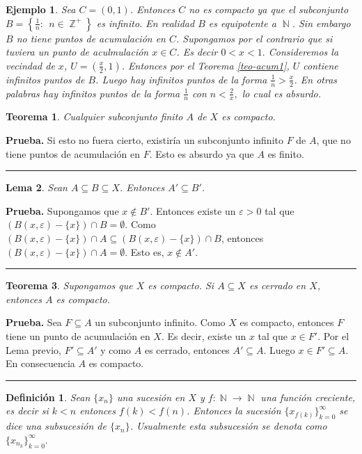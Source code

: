\documentclass[x11names, 12pt]{book}
\newtheorem{definicion}{Definición}
\newtheorem{teorema}{Teorema}
\newtheorem{lema}[teorema]{Lema}
\newtheorem{example}{Ejemplo}
\newenvironment{prueba}[1][Prueba]{\noindent\textbf{#1.} }{\ \rule{0.5em}{0.5em}}
\DeclareMathOperator{\ene}{\mathbb{N}}
\DeclareMathOperator{\seta}{\mathbb{Z}}
\begin{document}
\begin{example}
Sea $C=(0,1)$. Entonces $C$ no es compacto ya que el subconjunto $B=\left\{ \frac{1}{n}: \ \ n\in \seta^+ \right\}$ es infinito.  En realidad $B$ es equipotente a $\ene$. Sin embargo $B$ no tiene puntos de acumulación en $C$. Supongamos por el contrario que si tuviera un punto de aculmulación $x\in C$. Es decir $0<x<1.$ Consideremos la vecindad de $x$, $U=(\frac{x}2, 1)$. Entonces por el Teorema \ref{teo-acum1}, $U$ contiene infinitos puntos de $B$. Luego hay infinitos puntos de la forma $\frac{1}{n}>\frac{x}{2}$. En otras palabras hay infinitos puntos de la forma $\frac{1}{n}$ con $n<\frac{2}{x},$ lo cual es absurdo.
\end{example}


\begin{teorema}
Cualquier subconjunto finito $A$ de $X$ es compacto.
\end{teorema}
\begin{prueba}
Si esto no fuera cierto, existiría un  subconjunto infinito $F$ de $A$, que no tiene puntos de acumulación en $F$. Esto es absurdo ya que $A$ es finito.
\end{prueba}

\begin{lema}
Sean $A\subseteq B\subseteq X$. Entonces $A' \subseteq B'$.
\end{lema}
\begin{prueba}
Supongamos que $x\notin B'$. Entonces existe un $\varepsilon>0$ tal que $(B(x,\varepsilon)-\{x\}) \cap B = \emptyset$. Como \linebreak $(B(x,\varepsilon)-\{x\}) \cap A \subseteq (B(x,\varepsilon)-\{x\}) \cap B$, entonces  $(B(x,\varepsilon)-\{x\}) \cap A =\emptyset$. Esto es, $x\notin A'$.
\end{prueba}


\begin{teorema}\label{cerr-sub-comp}
Supongamos que $X$ es compacto. Si $A\subseteq X$ es cerrado en $X$, entonces $A$ es compacto.
\end{teorema}
\begin{prueba}
Sea $F\subseteq A$ un subconjunto infinito. Como $X$ es compacto, entonces $F$ tiene un punto de acumulación en $ X$. Es decir, existe un $x$ tal que $x\in F'$. Por el Lema previo, $F'\subseteq A'$ y como $A$ es cerrado, entonces $A' \subseteq A$. Luego $x\in F' \subseteq A$. En consecuencia $A$ es compacto.
\end{prueba}


\begin{definicion}
    Sean $\{x_n\}$ una sucesión en $X$ y $f:\ene \to \ene$ una función creciente, es decir si $k<n$ entonces $f(k)<f(n)$. Entonces la sucesión $\{x_{f(k)}\}_{k=0}^\infty$ se dice una subsucesión de $\{x_n\}$. Usualmente esta subsucesión se denota como $\{x_{n_k} \}_{k=0}^\infty.$
\end{definicion}
\end{document}
